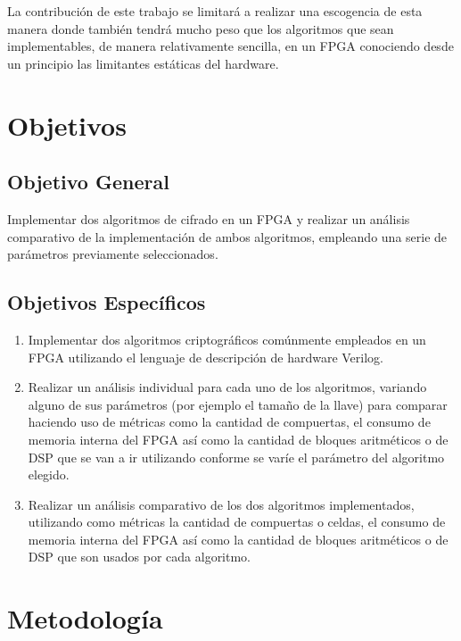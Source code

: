La contribución de este trabajo se limitará a realizar una escogencia de esta manera donde también tendrá mucho peso que los algoritmos que sean implementables, de manera relativamente sencilla, en un FPGA conociendo desde un principio las limitantes estáticas del hardware.

\section{Objetivos}

\subsection{Objetivo General}

Implementar dos algoritmos de cifrado en un FPGA y realizar un análisis comparativo de la implementación de ambos algoritmos, empleando una serie de parámetros previamente seleccionados.


\subsection{Objetivos Específicos}

\begin{enumerate}

\item Implementar dos algoritmos criptográficos comúnmente empleados en un FPGA utilizando el lenguaje de descripción de hardware Verilog.

\item Realizar un análisis individual para cada uno de los algoritmos, variando alguno de sus parámetros (por ejemplo el tamaño de la llave) para comparar haciendo uso de métricas como la cantidad de compuertas, el consumo de memoria interna del FPGA así como la cantidad de bloques aritméticos o de DSP que se van a ir utilizando conforme se varíe el parámetro del algoritmo elegido.

\item Realizar un análisis comparativo de los dos algoritmos implementados, utilizando como métricas la cantidad de compuertas o celdas, el consumo de memoria interna del FPGA así como la cantidad de bloques aritméticos o de DSP que son usados por cada algoritmo.


\end{enumerate}

\section{Metodología}

